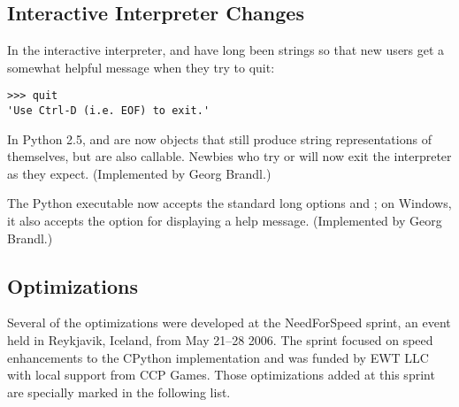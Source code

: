 \documentclass{howto}
\begin{document}
\subsection{Interactive Interpreter Changes\label{interactive}}

In the interactive interpreter,  and  
have long been strings so that new users get a somewhat helpful message
when they try to quit:

\begin{verbatim}
>>> quit
'Use Ctrl-D (i.e. EOF) to exit.'
\end{verbatim}

In Python 2.5,  and  are now objects that still
produce string representations of themselves, but are also callable.
Newbies who try  or  will now exit the
interpreter as they expect.  (Implemented by Georg Brandl.)

The Python executable now accepts the standard long options 
 and ; on Windows, 
it also accepts the  option for displaying a help message.
(Implemented by Georg Brandl.)


\subsection{Optimizations\label{opts}}

Several of the optimizations were developed at the NeedForSpeed
sprint, an event held in Reykjavik, Iceland, from May 21--28 2006.
The sprint focused on speed enhancements to the CPython implementation
and was funded by EWT LLC with local support from CCP Games.  Those
optimizations added at this sprint are specially marked in the
following list.
\end{document}
